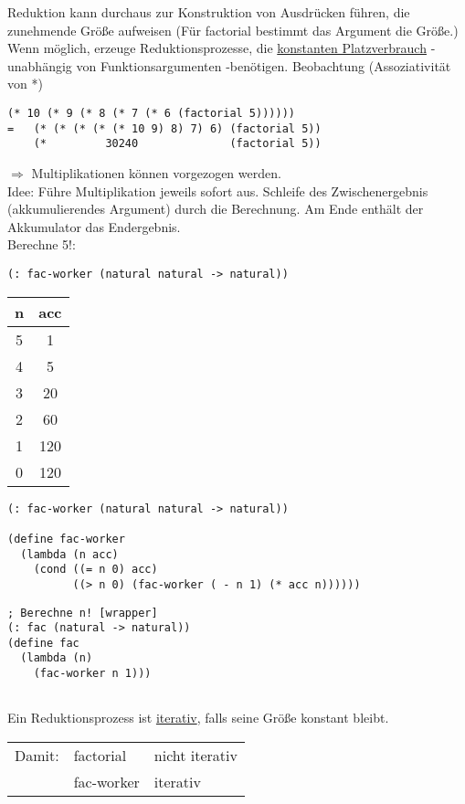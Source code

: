 \documentclass[a4paper,12pt]{article}
\begin{document}
Reduktion kann durchaus zur Konstruktion von Ausdrücken führen, die zunehmende Größe aufweisen (Für factorial bestimmt das Argument die Größe.)
Wenn möglich, erzeuge Reduktionsprozesse, die \uline{konstanten Platzverbrauch} - unabhängig von Funktionsargumenten -benötigen.
Beobachtung (Assoziativität von *)
\begin{lstlisting}[style=customc]
    (* 10 (* 9 (* 8 (* 7 (* 6 (factorial 5))))))
=   (* (* (* (* (* 10 9) 8) 7) 6) (factorial 5))
    (*         30240              (factorial 5))
\end{lstlisting}
$\Rightarrow$ Multiplikationen können vorgezogen werden.\\

Idee: Führe Multiplikation jeweils sofort aus.
Schleife des Zwischenergebnis (akkumulierendes Argument) durch die Berechnung. Am Ende enthält der Akkumulator das Endergebnis.\\
Berechne 5!:\\
\begin{lstlisting}[style=customc]
(: fac-worker (natural natural -> natural))
\end{lstlisting}
\begin{center}
\begin{tabular}{c|c}
n & acc \\
\hline
5 & 1   \\
4 & 5   \\
3 & 20  \\
2 & 60  \\
1 & 120 \\
0 & 120 \\
\end{tabular}
\end{center}
\begin{lstlisting}[style=customc]
(: fac-worker (natural natural -> natural))

(define fac-worker
  (lambda (n acc)
    (cond ((= n 0) acc)
		  ((> n 0) (fac-worker ( - n 1) (* acc n))))))
\end{lstlisting}
\begin{lstlisting}[style=customc]
; Berechne n! [wrapper]
(: fac (natural -> natural))
(define fac
  (lambda (n)
    (fac-worker n 1)))
    	
\end{lstlisting}
Ein Reduktionsprozess ist \uline{iterativ}, falls seine Größe konstant bleibt.\\
\begin{tabular}{lll}
Damit: & factorial & nicht iterativ \\
 &		fac-worker & iterativ \\
\end{tabular}\\
\end{document}
